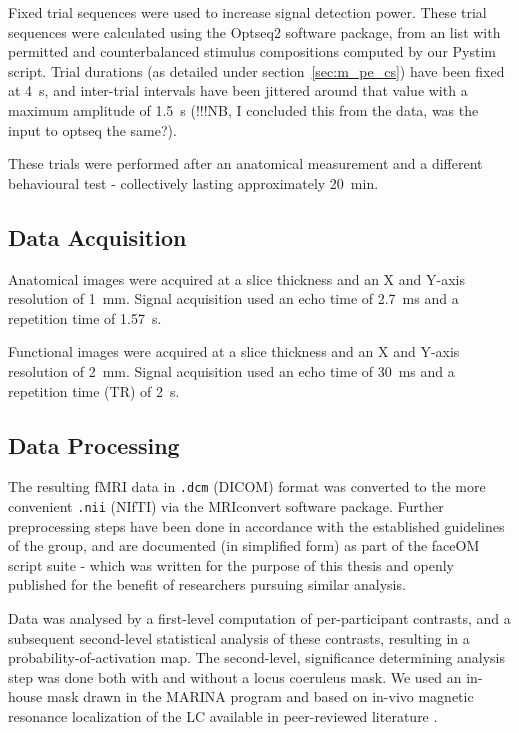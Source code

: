	    Fixed trial sequences were used to increase signal detection power.
	    These trial sequences were calculated using the Optseq2 \cite{optseq} software package, from an list with permitted and counterbalanced stimulus compositions computed by our Pystim\cite{pystim} script.
	    Trial durations (as detailed under section~\ref{sec:m_pe_cs}) have been fixed at \SI{4}{\second}, and inter-trial intervals have been jittered around that value with a maximum amplitude of \SI{1.5}{\second} (!!!NB, I concluded this from the data, was the input to optseq the same?). 
	    
	    These trials were performed after an anatomical measurement and a different behavioural test - collectively lasting approximately \SI{20}{\minute}.
	\subsection{Data Acquisition}
	    Anatomical images were acquired at a slice thickness and an X and Y-axis resolution of \SI{1}{\milli\metre}.
	    Signal acquisition used an echo time of \SI{2.7}{\milli\second} and a repetition time of \SI{1.57}{\second}.
	
	    Functional images were acquired at a slice thickness and an X and Y-axis resolution of \SI{2}{\milli\metre}.
	    Signal acquisition used an echo time of \SI{30}{\milli\second} and a repetition time (TR) of \SI{2}{\second}.
	\subsection{Data Processing}
	    The resulting fMRI data in \colorbox{vlg}{\texttt{.dcm}} (DICOM) format was converted to the more convenient \colorbox{vlg}{\texttt{.nii}} (NIfTI) via the MRIconvert \cite{MRIconvert} software package.
	    Further preprocessing steps have been done in accordance with the established guidelines of the group, and are documented (in simplified form) as part of the faceOM script suite \cite{faceOM} - which was written for the purpose of this thesis and openly published for the benefit of researchers pursuing similar analysis.
	    
	    Data was analysed by a first-level computation of per-participant contrasts, and a subsequent second-level statistical analysis of these contrasts, resulting in a probability-of-activation map.
	    The second-level, significance determining analysis step was done both with and without a locus coeruleus mask.
	    We used an in-house mask drawn in the MARINA program \cite{Walter2003} and based on in-vivo magnetic resonance localization of the LC available in peer-reviewed literature \cite{Keren2009}.
	    
